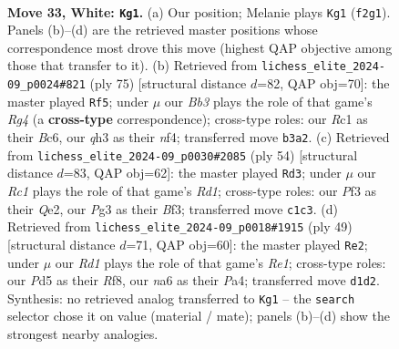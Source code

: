 \documentclass[11pt]{article}
\begin{document}
\clearpage

\begin{figure}[p]\centering
\begin{subfigure}{0.46\textwidth}\centering
\resizebox{\linewidth}{!}{%
\newchessgame
\chessboard[
  setfen={1rb5/pp4k1/n5p1/2pP2pp/8/PB1Q1PPq/1P3K1P/2RR4 w - - 5 33},
  showmover=false,
  pgfstyle=straightmove, color=movearrow, markmove={f2-g1}
]}
\caption{}
\end{subfigure}\hfill
\begin{subfigure}{0.46\textwidth}\centering
\resizebox{\linewidth}{!}{%
\newchessgame
\chessboard[
  setfen={8/p3qp1k/Pnb3p1/2p3r1/5N1p/4P2P/1Q3PP1/2R2B1K b - - 12 38},
  showmover=false,
  pgfstyle=straightmove, color=movearrow, markmove={g5-f5}
]}
\caption{}
\end{subfigure}
\\[4pt]
\begin{subfigure}{0.46\textwidth}\centering
\resizebox{\linewidth}{!}{%
\newchessgame
\chessboard[
  setfen={1k5r/p4pp1/Pppb4/4qPn1/1P1pP1Pp/5B2/2P1Q3/3R1R1K w - - 2 28},
  showmover=false,
  pgfstyle=straightmove, color=movearrow, markmove={d1-d3}
]}
\caption{}
\end{subfigure}\hfill
\begin{subfigure}{0.46\textwidth}\centering
\resizebox{\linewidth}{!}{%
\newchessgame
\chessboard[
  setfen={4rrk1/1R3pb1/3p4/7p/p1Pq2pP/6B1/PPQN1PP1/6K1 b - - 0 25},
  showmover=false,
  pgfstyle=straightmove, color=movearrow, markmove={e8-e2}
]}
\caption{}
\end{subfigure}
\caption{\textbf{Move 33, White: \texttt{Kg1}.} (a) Our position; Melanie plays \texttt{Kg1} (\texttt{f2g1}). Panels (b)--(d) are the retrieved master positions whose correspondence most drove this move (highest QAP objective among those that transfer to it). (b) Retrieved from \texttt{lichess\_elite\_2024-09\_p0024\#821} (ply 75) [structural distance $d$=82, QAP obj=70]: the master played \texttt{Rf5}; under $\mu$ our \emph{Bb3} plays the role of that game's \emph{Rg4} (a \textbf{cross-type} correspondence); cross-type roles: our \emph{R}c1 as their \emph{B}c6, our \emph{q}h3 as their \emph{n}f4; transferred move \texttt{b3a2}. (c) Retrieved from \texttt{lichess\_elite\_2024-09\_p0030\#2085} (ply 54) [structural distance $d$=83, QAP obj=62]: the master played \texttt{Rd3}; under $\mu$ our \emph{Rc1} plays the role of that game's \emph{Rd1}; cross-type roles: our \emph{P}f3 as their \emph{Q}e2, our \emph{P}g3 as their \emph{B}f3; transferred move \texttt{c1c3}. (d) Retrieved from \texttt{lichess\_elite\_2024-09\_p0018\#1915} (ply 49) [structural distance $d$=71, QAP obj=60]: the master played \texttt{Re2}; under $\mu$ our \emph{Rd1} plays the role of that game's \emph{Re1}; cross-type roles: our \emph{P}d5 as their \emph{R}f8, our \emph{n}a6 as their \emph{P}a4; transferred move \texttt{d1d2}. Synthesis: no retrieved analog transferred to \texttt{Kg1} -- the \texttt{search} selector chose it on value (material / mate); panels (b)--(d) show the strongest nearby analogies.}
\label{fig:thought-m64}
\end{figure}
\end{document}
